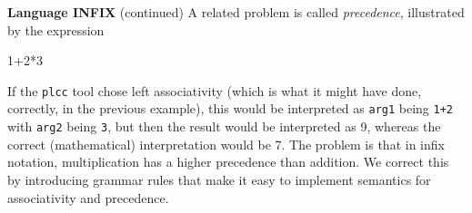 \begin{minipage}[t]{\sw}
\slidenumber
\LARGE
{\bf Language INFIX} (continued)\exx
A related problem is called {\em precedence},
illustrated by the expression
\begin{qv}
1+2*3
\end{qv}
If the \verb'plcc' tool chose left associativity
(which is what it might have done, correctly, in the previous example),
this would be interpreted as \verb'arg1' being \verb'1+2'
with \verb'arg2' being \verb'3',
but then the result would be interpreted as 9,
whereas the correct (mathematical) interpretation would be 7.
The problem is that in infix notation,
multiplication has a higher precedence than addition.\exx
We correct this by introducing grammar rules
that make it easy to implement semantics for associativity and precedence.
\end{minipage}
